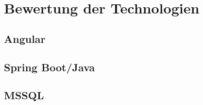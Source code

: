 \chapter{Bewertung der Technologien}\label{ch:experiments}
\section{Angular}
\section{Spring Boot/Java}
\section{MSSQL}
